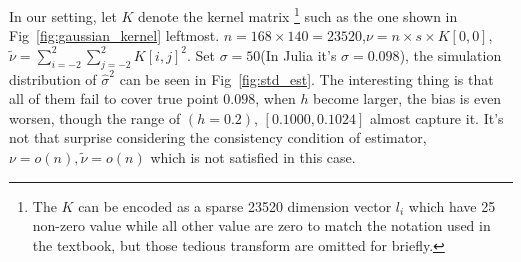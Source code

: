 \documentclass{beamer}
\begin{document}
\begin{frame}
  In our setting, let $K$ denote the kernel matrix
  \footnote{The $K$ can be encoded as a sparse 23520 dimension vector $l_i$ which have 25 non-zero value while all other value are zero to match
  the notation used in the textbook, but those tedious transform are omitted for briefly.}
  such as the one shown in Fig~\ref{fig:gaussian_kernel} leftmost.
  $n = 168 \times 140 = 23520$,$\nu = n \times s \times K[0,0]$,
  $\tilde{\nu} = \sum_{i=-2}^2\sum_{j=-2}^2 K[i,j]^2$. 
  Set $\sigma=50$(In Julia it's $\sigma=0.098$), 
  the simulation distribution of $\hat{\sigma}^2$ can be seen in Fig~\ref{fig:std_est}. 
  The interesting thing is that all of them fail to cover true point $0.098$, when $h$ become larger,
  the bias is even worsen, though the range of $(h=0.2)$, $[0.1000,0.1024]$ almost capture it.
  It's not that surprise considering the consistency condition of estimator, 
  $\nu=o(n),\tilde{\nu}=o(n)$ which is not satisfied in this case.
  

\end{frame}
\end{document}
